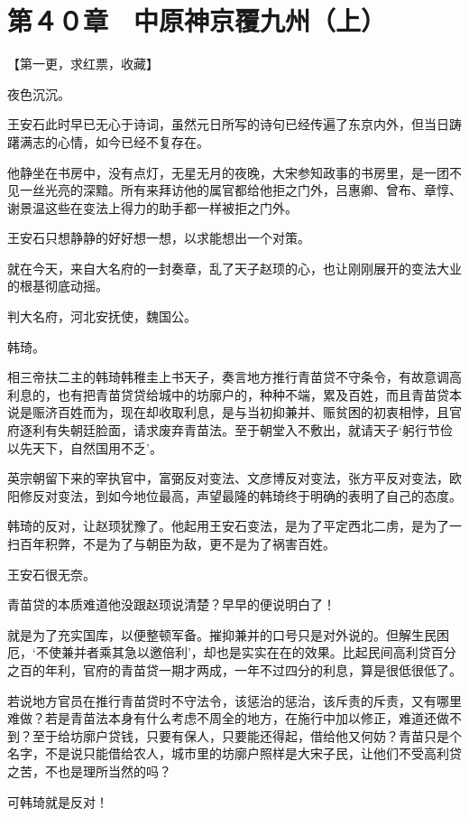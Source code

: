 \section{第４０章　中原神京覆九州（上）}

【第一更，求红票，收藏】

夜色沉沉。

王安石此时早已无心于诗词，虽然元日所写的诗句已经传遍了东京内外，但当日踌躇满志的心情，如今已经不复存在。

他静坐在书房中，没有点灯，无星无月的夜晚，大宋参知政事的书房里，是一团不见一丝光亮的深黯。所有来拜访他的属官都给他拒之门外，吕惠卿、曾布、章惇、谢景温这些在变法上得力的助手都一样被拒之门外。

王安石只想静静的好好想一想，以求能想出一个对策。

就在今天，来自大名府的一封奏章，乱了天子赵顼的心，也让刚刚展开的变法大业的根基彻底动摇。

判大名府，河北安抚使，魏国公。

韩琦。

相三帝扶二主的韩琦韩稚圭上书天子，奏言地方推行青苗贷不守条令，有故意调高利息的，也有把青苗贷贷给城中的坊廓户的，种种不端，累及百姓，而且青苗贷本说是赈济百姓而为，现在却收取利息，是与当初抑兼并、赈贫困的初衷相悖，且官府逐利有失朝廷脸面，请求废弃青苗法。至于朝堂入不敷出，就请天子‘躬行节俭以先天下，自然国用不乏’。

英宗朝留下来的宰执官中，富弼反对变法、文彦博反对变法，张方平反对变法，欧阳修反对变法，到如今地位最高，声望最隆的韩琦终于明确的表明了自己的态度。

韩琦的反对，让赵顼犹豫了。他起用王安石变法，是为了平定西北二虏，是为了一扫百年积弊，不是为了与朝臣为敌，更不是为了祸害百姓。

王安石很无奈。

青苗贷的本质难道他没跟赵顼说清楚？早早的便说明白了！

就是为了充实国库，以便整顿军备。摧抑兼并的口号只是对外说的。但解生民困厄，‘不使兼并者乘其急以邀倍利’，却也是实实在在的效果。比起民间高利贷百分之百的年利，官府的青苗贷一期才两成，一年不过四分的利息，算是很低很低了。

若说地方官员在推行青苗贷时不守法令，该惩治的惩治，该斥责的斥责，又有哪里难做？若是青苗法本身有什么考虑不周全的地方，在施行中加以修正，难道还做不到？至于给坊廓户贷钱，只要有保人，只要能还得起，借给他又何妨？青苗只是个名字，不是说只能借给农人，城市里的坊廓户照样是大宋子民，让他们不受高利贷之苦，不也是理所当然的吗？

可韩琦就是反对！

